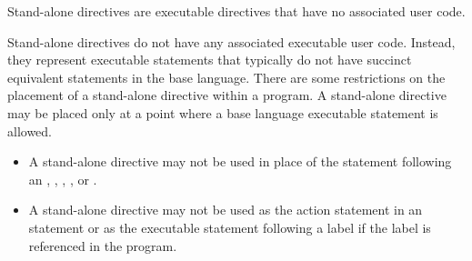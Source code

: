 \summary
Stand-alone directives are executable directives that have no associated user code.

\descr
Stand-alone directives do not have any associated executable user code. Instead, 
they represent executable statements that typically do not have succinct equivalent 
statements in the base language. There are some restrictions on the placement of a 
stand-alone directive within a program. A stand-alone directive may be placed only 
at a point where a base language executable statement is allowed.

\restrictions
\begin{ccppspecific}
\begin{itemize}
\item A stand-alone directive may not be used in place of the statement following
      an , , , , or .
\end{itemize}
\end{ccppspecific}

\begin{fortranspecific}
\begin{itemize}
\item A stand-alone directive may not be used as the action statement in an 
       statement or as the executable statement following a label 
      if the label is referenced in the program.
\end{itemize}
\end{fortranspecific}



